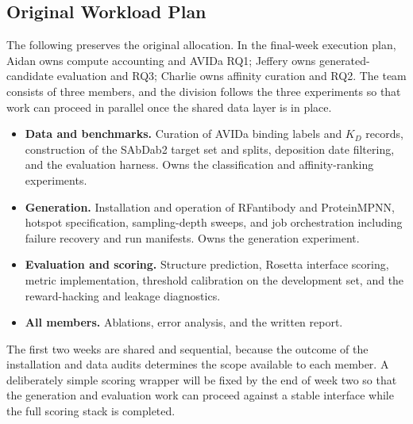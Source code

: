 \documentclass[11pt, logo, nonumbering]{preprint}
\begin{document}
\subsection{Original Workload Plan}
The following preserves the original allocation. In the final-week execution
plan, Aidan owns compute accounting and AVIDa RQ1; Jeffery owns generated-candidate
evaluation and RQ3; Charlie owns affinity curation and RQ2.
The team consists of three members, and the division follows the three experiments so that work can proceed in parallel once the shared data layer is in place.

\begin{itemize}[nosep]
    \item \textbf{Data and benchmarks.} Curation of AVIDa binding labels and $K_D$ records, construction of the SAbDab2 target set and splits, deposition date filtering, and the evaluation harness. Owns the classification and affinity-ranking experiments.
    \item \textbf{Generation.} Installation and operation of RFantibody and ProteinMPNN, hotspot specification, sampling-depth sweeps, and job orchestration including failure recovery and run manifests. Owns the generation experiment.
    \item \textbf{Evaluation and scoring.} Structure prediction, Rosetta interface scoring, metric implementation, threshold calibration on the development set, and the reward-hacking and leakage diagnostics.
    \item \textbf{All members.} Ablations, error analysis, and the written report.
\end{itemize}

\noindent The first two weeks are shared and sequential, because the outcome of the installation and data audits determines the scope available to each member.  A deliberately simple scoring wrapper will be fixed by the end of week two so that the generation and evaluation work can proceed against a stable interface while the full scoring stack is completed.
\end{document}
